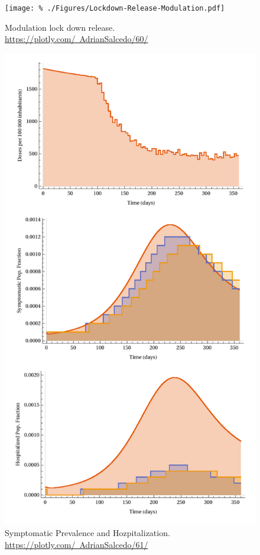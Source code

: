 \begin{figure}[tbh]
    \centering
    \texttt{[image: \%
        ./Figures/Lockdown-Release-Modulation.pdf]}
    \caption{Modulation lock down release.
    \href{https://plotly.com/~AdrianSalcedo/60/}
    {https://plotly.com/~AdrianSalcedo/60/}}
    \label{fig:lockdowneffect}
\end{figure}

\begin{figure}[tbh]
    \centering
    \includegraphics[scale=0.65, keepaspectratio]{figs/VaccinationEffect}
    \caption{Symptomatic Prevalence and Hozpitalization.
        \href{https://plotly.com/~AdrianSalcedo/61/}
        {https://plotly.com/~AdrianSalcedo/61/}}
    \label{fig:vaccinationeffect}
\end{figure}
